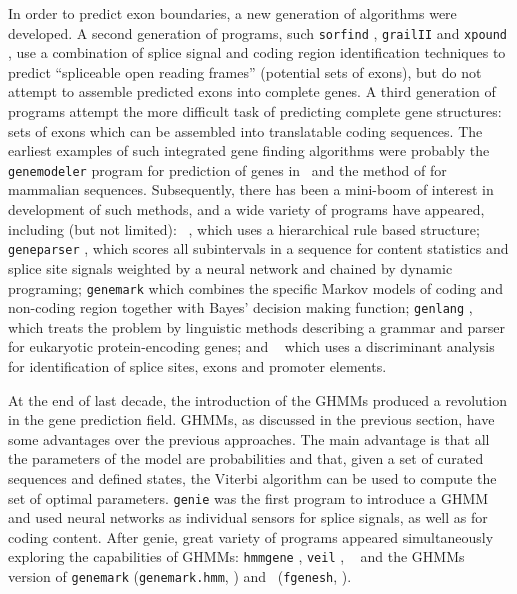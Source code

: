 In order to predict exon boundaries, a new generation of algorithms
were developed. A second generation of programs, such \texttt{sorfind}
\citep{hutchinson:1992a}, \texttt{grailII} \citep{xu:1994a} and 
\texttt{xpound} \citep{thomas:1994a}, use a combination of splice 
signal and coding region identification techniques to predict
``spliceable open reading frames'' (potential sets of exons), but do
not attempt to assemble predicted exons into complete genes. A third
generation of programs attempt the more difficult task of predicting
complete gene structures: sets of exons which can be assembled into
translatable coding sequences. The earliest examples of such
integrated gene finding algorithms were probably the
\texttt{genemodeler} program \citep{fields:1990a} for prediction of
genes in \Ce\ and the method of \cite{gelfand:1990a} for mammalian
sequences. Subsequently, there has been a mini-boom of interest in
development of such methods, and a wide variety of programs have
appeared, including (but not limited): \geneid\ \citep{guigo:1992a},
which uses a hierarchical rule based structure; \texttt{geneparser}
\citep{snyder:1993a}, which  scores all subintervals in a sequence for
content statistics and splice site signals weighted by a neural
network and chained by dynamic programing; \texttt{genemark}
\citep{borodovsky:1993a} which combines the specific Markov models of
coding and non-coding region together with Bayes' decision making
function; \texttt{genlang} \citep{dong:1994a}, which treats the
problem by linguistic methods describing a grammar and parser for
eukaryotic protein-encoding genes; and \fgenes\ \citep{solovyev:1994a}
which uses a discriminant analysis for identification of splice sites,
exons and promoter elements.

At the end of last decade, the introduction of the GHMMs produced a
revolution in the gene prediction field. GHMMs, as discussed in the
previous section, have some advantages over the previous approaches.
The main advantage is that all the parameters of the model are
probabilities and that, given a set of curated sequences and defined
states, the Viterbi algorithm can be used to compute the set of optimal
parameters. \texttt{genie} \citep{kulp:1996a} was the first program to
introduce a GHMM and used neural networks as individual sensors for
splice signals, as well as for coding content. After genie, great
variety of programs appeared simultaneously exploring the capabilities
of GHMMs: \texttt{hmmgene} \citep{krogh:1997a}, \texttt{veil} 
\citep{henderson:1997a}, \genscan\ \citep{burge:1997a} and the GHMMs 
version of \texttt{genemark} (\texttt{genemark.hmm}, \cite{lukashin:1998a}) 
and \fgenes\ (\texttt{fgenesh}, \cite{salamov:2000a}).


